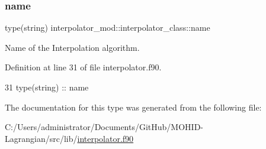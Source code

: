 \subsubsection{\texorpdfstring{name}{name}}
{\footnotesize\ttfamily type(string) interpolator\+\_\+mod\+::interpolator\+\_\+class\+::name\hspace{0.3cm}{\ttfamily [private]}}



Name of the Interpolation algorithm. 



Definition at line 31 of file interpolator.\+f90.


\begin{DoxyCode}
31         \textcolor{keywordtype}{type}(string) :: name
\end{DoxyCode}


The documentation for this type was generated from the following file\+:\begin{DoxyCompactItemize}
\item 
C\+:/\+Users/administrator/\+Documents/\+Git\+Hub/\+M\+O\+H\+I\+D-\/\+Lagrangian/src/lib/\mbox{\hyperlink{interpolator_8f90}{interpolator.\+f90}}\end{DoxyCompactItemize}
